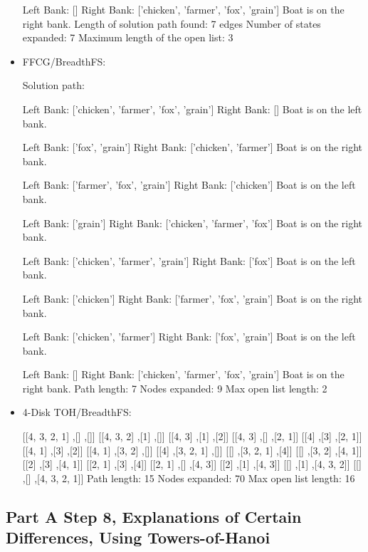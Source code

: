 \documentclass{article}
\begin{document}
\begin{itemize}
Left Bank: []
Right Bank: ['chicken', 'farmer', 'fox', 'grain']
Boat is on the right bank.
Length of solution path found: 7 edges
Number of states expanded: 7
Maximum length of the open list: 3

 \item FFCG/BreadthFS:

 Solution path:

 Left Bank: ['chicken', 'farmer', 'fox', 'grain']
 Right Bank: []
 Boat is on the left bank.
 
 Left Bank: ['fox', 'grain']
 Right Bank: ['chicken', 'farmer']
 Boat is on the right bank.
 
 Left Bank: ['farmer', 'fox', 'grain']
 Right Bank: ['chicken']
 Boat is on the left bank.
 
 Left Bank: ['grain']
 Right Bank: ['chicken', 'farmer', 'fox']
 Boat is on the right bank.
 
 Left Bank: ['chicken', 'farmer', 'grain']
 Right Bank: ['fox']
 Boat is on the left bank.
 
 Left Bank: ['chicken']
 Right Bank: ['farmer', 'fox', 'grain']
 Boat is on the right bank.
 
 Left Bank: ['chicken', 'farmer']
 Right Bank: ['fox', 'grain']
 Boat is on the left bank.
 
 Left Bank: []
 Right Bank: ['chicken', 'farmer', 'fox', 'grain']
 Boat is on the right bank.
 Path length: 7
 Nodes expanded: 9
 Max open list length: 2

 \item 4-Disk TOH/BreadthFS:

 [[4, 3, 2, 1] ,[] ,[]]
[[4, 3, 2] ,[1] ,[]]
[[4, 3] ,[1] ,[2]]
[[4, 3] ,[] ,[2, 1]]
[[4] ,[3] ,[2, 1]]
[[4, 1] ,[3] ,[2]]
[[4, 1] ,[3, 2] ,[]]
[[4] ,[3, 2, 1] ,[]]
[[] ,[3, 2, 1] ,[4]]
[[] ,[3, 2] ,[4, 1]]
[[2] ,[3] ,[4, 1]]
[[2, 1] ,[3] ,[4]]
[[2, 1] ,[] ,[4, 3]]
[[2] ,[1] ,[4, 3]]
[[] ,[1] ,[4, 3, 2]]
[[] ,[] ,[4, 3, 2, 1]]
Path length: 15
Nodes expanded: 70
Max open list length: 16

 \end{itemize}

 \subsection{Part A Step 8,  Explanations of Certain Differences, Using Towers-of-Hanoi  }
\end{document}
